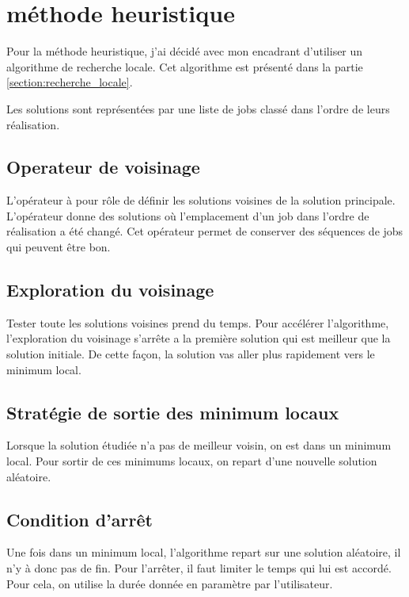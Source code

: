 

\section{méthode heuristique}
\label{section:analyse:methode_heuristique}

Pour la méthode heuristique, j'ai décidé avec mon encadrant d'utiliser un algorithme de recherche locale.
Cet algorithme est présenté dans la partie \autoref{section:recherche_locale}.
	
Les solutions sont représentées par une liste de jobs classé dans l'ordre de leurs réalisation.

\subsection{Operateur de voisinage}

L'opérateur à pour rôle de définir les solutions voisines de la solution principale.
L'opérateur donne des solutions où l'emplacement d'un job dans l'ordre de réalisation a été changé.
Cet opérateur permet de conserver des séquences de jobs qui peuvent être bon.

\subsection{Exploration du voisinage}

Tester toute les solutions voisines prend du temps.
Pour accélérer l'algorithme, l'exploration du voisinage s'arrête a la première solution qui est meilleur que la solution initiale.
De cette façon, la solution vas aller plus rapidement vers le minimum local.

\subsection{Stratégie de sortie des minimum locaux}
Lorsque la solution étudiée n'a pas de meilleur voisin, on est dans un minimum local.
Pour sortir de ces minimums locaux, on repart d'une nouvelle solution aléatoire.

\subsection{Condition d'arrêt}
Une fois dans un minimum local, l'algorithme repart sur une solution aléatoire, il n'y à donc pas de fin.
Pour l'arrêter, il faut limiter le temps qui lui est accordé.
Pour cela, on utilise la durée donnée en paramètre par l'utilisateur.

